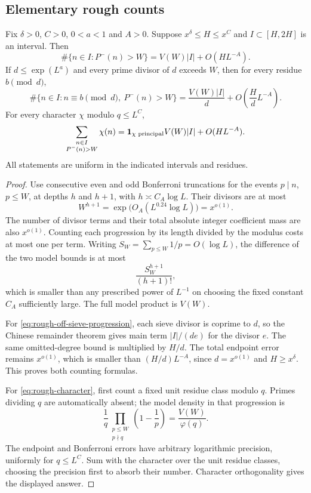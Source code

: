 \subsection{Elementary rough counts}

\begin{lemma}\label{lem:rough-counts}
Fix $\delta>0$, $C>0$, $0<a<1$ and $A>0$.  Suppose
$x^\delta\le H\le x^C$ and $I\subset[H,2H]$ is an interval.
Then
\begin{equation}\label{eq:rough-count}
 \#\{n\in I:P^-(n)>W\}=V(W)|I|+O(HL^{-A}).
\end{equation}
If $d\le\exp(L^a)$ and every prime divisor of $d$ exceeds $W$,
then for every residue $b\pmod d$,
\begin{equation}\label{eq:rough-off-sieve-progression}
 \#\{n\in I:n\equiv b\pmod d,\ P^-(n)>W\}
 =\frac{V(W)|I|}{d}+O\!\left(\frac Hd L^{-A}\right).
\end{equation}
For every character $\chi$ modulo $q\le L^C$,
\begin{equation}\label{eq:rough-character}
 \sum_{\substack{n\in I\\P^-(n)>W}}\chi(n)
 =\mathbf{1}_{\chi\text{ principal}}V(W)|I|+O(HL^{-A}).
\end{equation}
All statements are uniform in the indicated intervals and residues.
\end{lemma}

\begin{proof}
Use consecutive even and odd Bonferroni truncations for the events
$p\mid n$, $p\le W$, at depths $h$ and $h+1$, with
$h\asymp C_A\log L$.  Their divisors are at most
\[
 W^{h+1}=\exp\bigl(O_A(L^{0.24}\log L)\bigr)=x^{o(1)}.
\]
The number of divisor terms and their total absolute integer
coefficient mass are also $x^{o(1)}$.  Counting each progression
by its length divided by the modulus costs at most one per term.
Writing $S_W=\sum_{p\le W}1/p=O(\log L)$, the difference of the
two model bounds is at most
\[
 \frac{S_W^{h+1}}{(h+1)!},
\]
which is smaller than any prescribed power of $L^{-1}$ on choosing
the fixed constant $C_A$ sufficiently large.  The full model product
is $V(W)$.

For \eqref{eq:rough-off-sieve-progression}, each sieve divisor is
coprime to $d$, so the Chinese remainder theorem gives main term
$|I|/(de)$ for the divisor $e$.  The same omitted-degree bound is
multiplied by $H/d$.  The total endpoint error remains $x^{o(1)}$,
which is smaller than $(H/d)L^{-A}$, since $d=x^{o(1)}$ and
$H\ge x^\delta$.  This proves both counting formulas.

For \eqref{eq:rough-character}, first count a fixed unit residue
class modulo $q$.  Primes dividing $q$ are automatically absent;
the model density in that progression is
\[
 \frac1q\prod_{\substack{p\le W\\p\nmid q}}
        \left(1-\frac1p\right)=\frac{V(W)}{\varphi(q)}.
\]
The endpoint and Bonferroni errors have arbitrary logarithmic
precision, uniformly for $q\le L^C$.  Sum with the character over
the unit residue classes, choosing the precision first to absorb
their number.  Character orthogonality gives the displayed answer.
\end{proof}

